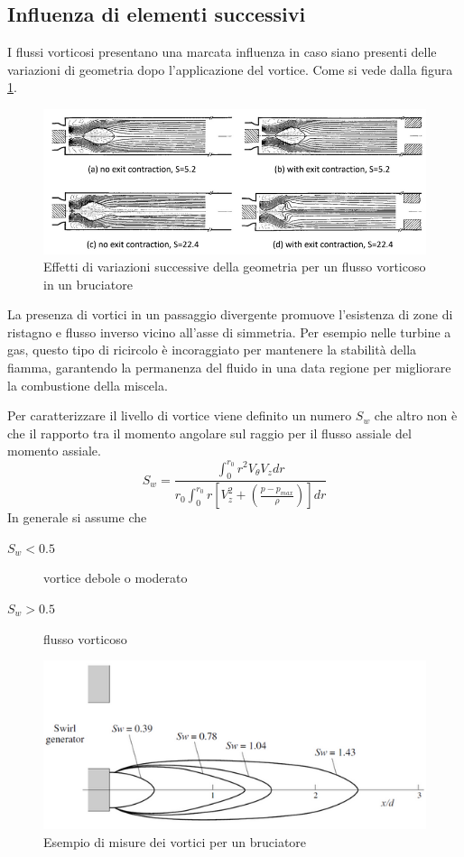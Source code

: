 \subsection{Influenza di elementi successivi}
I flussi vorticosi presentano una marcata influenza in caso siano presenti delle variazioni di geometria dopo l'applicazione del vortice.
Come si vede dalla figura \ref{fig:UpstreamInfluence}.

\begin{figure}
\centering
\includegraphics[width = \textwidth]{gfx/UpstreamInfluence}
\caption{Effetti di variazioni successive della geometria per un flusso vorticoso in un bruciatore}
\label{fig:UpstreamInfluence}
\end{figure}

La presenza di vortici in un passaggio divergente promuove l'esistenza di zone di ristagno e flusso inverso vicino all'asse di simmetria.
Per esempio nelle turbine a gas, questo tipo di ricircolo è incoraggiato per mantenere la stabilità della fiamma, garantendo la permanenza del fluido in una data regione per migliorare la combustione della miscela.

Per caratterizzare il livello di vortice viene definito un numero $S_w$ che altro non è che il rapporto tra il momento angolare sul raggio per il flusso assiale del momento assiale.
\begin{equation}
S_w = \frac{\int_0^{r_0}{r^2 V_{\theta}V_z dr}}{r_0 \int_0^{r_0}{r \left[V_z^2 + \left(\frac{p - p_{max}}{\rho}\right) \right]dr}}
\end{equation}
In generale si assume che 
\begin{description}
\item[$S_w < 0.5$] vortice debole o moderato
\item[$S_w > 0.5$] flusso vorticoso
\end{description}

\begin{figure}
\centering
\includegraphics[width = \textwidth]{gfx/Swirl}
\caption{Esempio di misure dei vortici per un bruciatore}
\label{fig:Swirl}
\end{figure}

